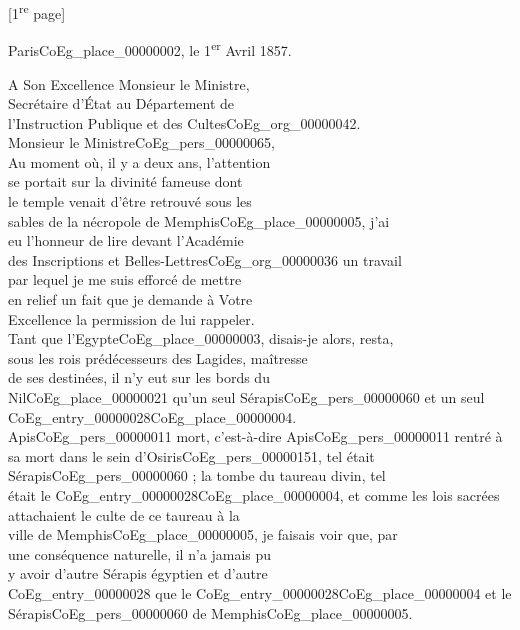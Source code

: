 \documentclass{book}
\begin{document}
{\footnotesize
{\footnotesize\begin{center} {[1\textsuperscript{re} page]}\end{center}}
\begin{paracol}{2}
\switchcolumn
\begin{flushright}Paris\gls{CoEg_place_00000002}, le 1\textsuperscript{er} Avril 1857.\end{flushright}
\indent A Son Excellence Monsieur le Ministre,\\
\indent Secrétaire d’État au Département de\\
\indent l’Instruction Publique et des Cultes\gls{CoEg_org_00000042}.\\

\hspace{1cm} Monsieur le Ministre\gls{CoEg_pers_00000065},\\

\indent Au moment où, il y a deux ans, l’attention\\
se portait sur la divinité fameuse dont\\
le temple venait d’être retrouvé sous les\\
sables de la nécropole de Memphis\gls{CoEg_place_00000005}, j’ai\\
eu l’honneur de lire devant l’Académie\\
des Inscriptions et Belles-Lettres\gls{CoEg_org_00000036} un travail\\
par lequel je me suis efforcé de mettre\\
en relief un fait que je demande à Votre\\
Excellence la permission de lui rappeler.\\
Tant que l’Egypte\gls{CoEg_place_00000003}, disais-je alors, resta,\\
sous les rois prédécesseurs des Lagides, maîtresse\\
de ses destinées, il n’y eut sur les bords du\\
Nil\gls{CoEg_place_00000021} qu’un seul Sérapis\gls{CoEg_pers_00000060} et un seul \Gls{CoEg_entry_00000028}\gls{CoEg_place_00000004}.\\
Apis\gls{CoEg_pers_00000011} mort, c’est-à-dire Apis\gls{CoEg_pers_00000011} rentré à\\
sa mort dans le sein d’Osiris\gls{CoEg_pers_00000151}, tel était\\
Sérapis\gls{CoEg_pers_00000060} ; la tombe du taureau divin, tel\\
était le \Gls{CoEg_entry_00000028}\gls{CoEg_place_00000004}, et comme les lois sacrées\\
attachaient le culte de ce taureau à la\\
ville de Memphis\gls{CoEg_place_00000005}, je faisais voir que, par\\
une conséquence naturelle, il n’a jamais pu\\
y avoir d’autre Sérapis égyptien et d’autre\\
\Gls{CoEg_entry_00000028} que le \Gls{CoEg_entry_00000028}\gls{CoEg_place_00000004} et le Sérapis\gls{CoEg_pers_00000060} de Memphis\gls{CoEg_place_00000005}.
\end{paracol}

}
\end{document}
